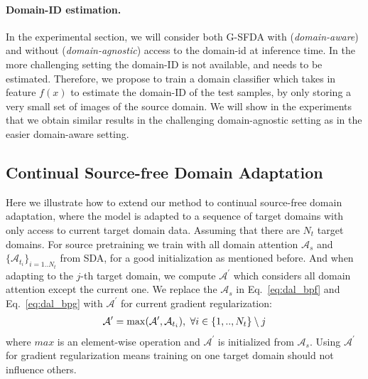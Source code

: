 \documentclass[10pt,twocolumn,letterpaper]{article}
\begin{document}
\vspace{-2mm}
\paragraph{Domain-ID estimation.} In the experimental section, we will consider both G-SFDA with (\emph{domain-aware}) and without (\emph{domain-agnostic}) access to the domain-id at inference time. In the more challenging setting the domain-ID is not available, and needs to be estimated. 
Therefore, we propose to train a domain classifier which takes in feature $f(x)$ to estimate the domain-ID of the test samples, by only storing a very small set of images of the source domain.  
We will show in the experiments that we obtain similar results in the challenging domain-agnostic setting as in the easier domain-aware setting.

\subsection{Continual Source-free Domain Adaptation}
Here we illustrate how to extend our method to continual source-free domain adaptation, where the model is adapted to a sequence of target domains with only access to current target domain data.
Assuming that there are $N_t$ target domains. For source pretraining we train with all domain attention $\mathcal{A}_s$ and $\{\mathcal{A}_{t_i}\}_{i=1..N_t}$ from SDA, for a good initialization as mentioned before. And when adapting to the $j$-th target domain, we compute $\mathcal{A}^{\prime}$ which considers all domain attention except the current one. We replace the $\mathcal{A}_s$ in Eq.~\ref{eq:dal_bpf} and Eq.~\ref{eq:dal_bpg} with $\mathcal{A}^{\prime}$ for current gradient regularization:
\begin{equation}\label{eq:dal_multi}
\begin{gathered}
\small
 \mathcal{A}^{\prime}= \max (\mathcal{A}^{\prime},\mathcal{A}_{t_i}),\ {\forall i \in \{1,..,N_t\}\setminus j}
\end{gathered}
\end{equation}
where $max$ is an element-wise operation and $\mathcal{A}^{\prime}$ is initialized from $\mathcal{A}_s$. Using $\mathcal{A}^{\prime}$ for gradient regularization means training on one target domain should not influence others.
\end{document}
